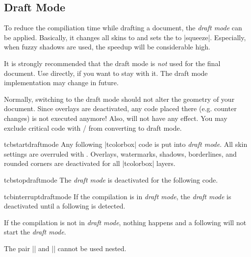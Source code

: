 \clearpage
\subsection{Draft Mode}\label{subsec:draftmode}
To reduce the compiliation time while drafting a document, the \emph{draft mode}
can be applied. Basically, it changes all skins to  and
sets the  to |squeeze|. Especially,
when fuzzy shadows are used, the speedup will be considerable high.

\begin{marker}
It is strongly recommended that the draft mode is \emph{not} used for the final document.
Use  directly, if you want to stay with it. The draft mode
implementation may change in future.
\end{marker}

\begin{marker}
Normally, switching to the draft mode should not alter the geometry of
your document. Since overlays are deactivated, any code placed there
(e.g. counter changes) is not executed anymore! Also, 
will not have any effect. You may exclude critical code with
 / 
from converting to draft mode.
\end{marker}


\begin{docCommand}{tcbstartdraftmode}{}
  Any following |tcolorbox| code is put into \emph{draft mode}. All skin
  settings are overruled with . Overlays, watermarks,
  shadows, borderlines, and rounded corners are deactivated for all |tcolorbox|
  layers.
\end{docCommand}

\begin{docCommand}{tcbstopdraftmode}{}
  The \emph{draft mode} is deactivated for the following code.
\end{docCommand}

\begin{docCommand}{tcbinterruptdraftmode}{}
  If the compilation is in \emph{draft mode}, the \emph{draft mode} is deactivated
  until a following  is detected.\par
  If the compilation is not in \emph{draft mode}, nothing happens and a following
   will not start the \emph{draft mode}.
  \begin{marker}
  The pair |\tcbinterruptdraftmode| and |\tcbcontinuedraftmode| cannot
  be used nested.
  \end{marker}
\end{docCommand}

